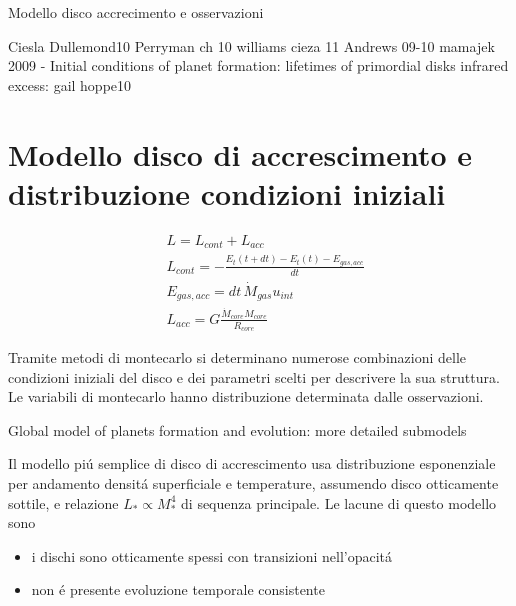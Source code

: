 \begin{reworking}{Modello disco accrecimento e osservazioni}
	\begin{workout}
		Ciesla Dullemond10 
		Perryman ch 10
		williams cieza 11
		Andrews 09-10
		mamajek 2009 - Initial conditions of planet formation: lifetimes of primordial disks
		infrared excess: gail hoppe10
	\end{workout}
\end{reworking}


\section{Modello disco di accrescimento e distribuzione condizioni iniziali}

\begin{workout}
	\begin{align}
	&L=L_{cont}+L_{acc}\\
	&L_{cont}=-\frac{E_t(t+dt)-E_t(t)-E_{gas,acc}}{dt}\\
	&E_{gas,acc}=dt\,\dot{M}_{gas}u_{int}\\
	&L_{acc}=G\frac{\dot{M}_{core}M_{core}}{R_{core}}
	\end{align}
\end{workout}

Tramite metodi di montecarlo si determinano numerose combinazioni delle condizioni iniziali del disco e dei parametri scelti per descrivere la sua struttura.
Le variabili di montecarlo hanno distribuzione determinata dalle osservazioni.

\begin{workout}
	Global model of planets formation and evolution: more detailed submodels
\end{workout}

Il modello pi\'u semplice di disco di accrescimento usa distribuzione esponenziale per andamento densit\'a superficiale e temperature, assumendo disco otticamente sottile, e relazione $L_*\propto M_*^4$ di sequenza principale. Le lacune di questo modello sono
\begin{itemize}
	\item i dischi sono otticamente spessi con transizioni nell'opacit\'a
	\item non \'e presente evoluzione temporale consistente
\end{itemize}

